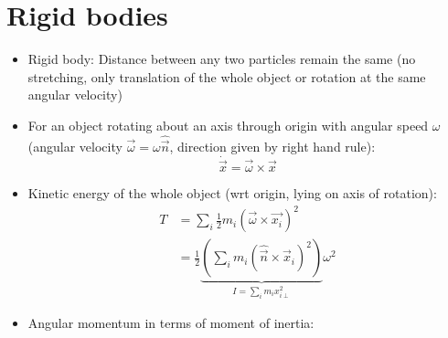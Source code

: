 \section{Rigid bodies}
\begin{itemize}
    \item Rigid body: Distance between any two particles remain the same (no stretching, only translation of the whole object or rotation at the same angular velocity)
    \item For an object rotating about an axis through origin with angular speed $\omega$ (angular velocity $\vec{\omega} = \omega \hat{\vec{n}}$, direction given by right hand rule):
          \[\dot{\vec{x}} = \vec{\omega} \times \vec{x}\]

    \item Kinetic energy of the whole object (wrt origin, lying on axis of rotation):
          \begin{align*}
              T & = \sum_i \frac{1}{2} m_i (\vec{\omega} \times \vec{x_i})^2                                                                        \\
                & = \frac{1}{2} \underbrace{\left( \sum_i m_i (\hat{\vec{n}} \times \vec{x}_{i})^2\right)}_{I = \sum_i m_i x_{i\perp}^2  } \omega^2
          \end{align*}

    \item Angular momentum in terms of moment of inertia:


\end{itemize}
